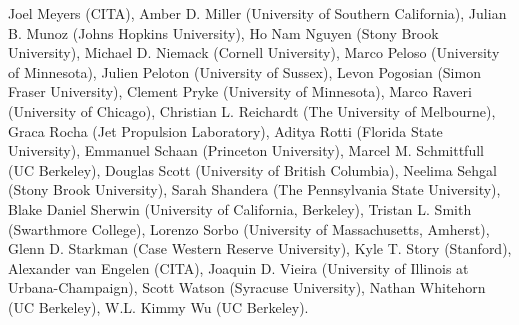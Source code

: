 Joel Meyers (CITA),
Amber D. Miller (University of Southern California),
Julian B. Munoz (Johns Hopkins University),
Ho Nam Nguyen (Stony Brook University),
Michael D. Niemack (Cornell University),
Marco Peloso (University of Minnesota),
Julien Peloton (University of Sussex),
Levon Pogosian (Simon Fraser University),
Clement Pryke (University of Minnesota),
Marco Raveri (University of Chicago),
Christian L. Reichardt (The University of Melbourne),
Graca Rocha (Jet Propulsion Laboratory),
Aditya Rotti (Florida State University),
Emmanuel Schaan (Princeton University),
Marcel M. Schmittfull (UC Berkeley),
Douglas Scott (University of British Columbia),
Neelima Sehgal (Stony Brook University),
Sarah Shandera (The Pennsylvania State University),
Blake Daniel Sherwin (University of California, Berkeley),
Tristan L. Smith (Swarthmore College),
Lorenzo Sorbo (University of Massachusetts, Amherst),
Glenn D. Starkman (Case Western Reserve University),
Kyle T. Story (Stanford),
Alexander van Engelen (CITA),
Joaquin D. Vieira (University of Illinois at Urbana-Champaign),
Scott Watson (Syracuse University),
Nathan Whitehorn (UC Berkeley),
W.L. Kimmy Wu (UC Berkeley).
